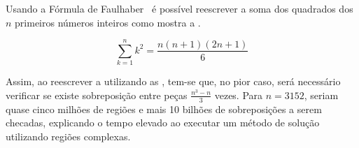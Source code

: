 Usando a Fórmula de Faulhaber~\cite{merca2015alternative} é possível reescrever a soma dos quadrados
dos $n$ primeiros números inteiros como mostra a .

\begin{equation}
    \label{eq:sum-k-pow-2}
    \sum_{k=1}^{n} k^2 = \dfrac{n(n+1)(2n+1)}{6}
\end{equation}

Assim, ao reescrever a  utilizando as ,
tem-se que, no pior caso, será necessário verificar se existe sobreposição entre peças
$\frac{n^3-n}{3}$ vezes.
Para $n = 3152$, seriam quase cinco milhões de regiões e mais 10 bilhões de sobreposições a serem
checadas, explicando o tempo elevado ao executar um método de solução utilizando regiões complexas.